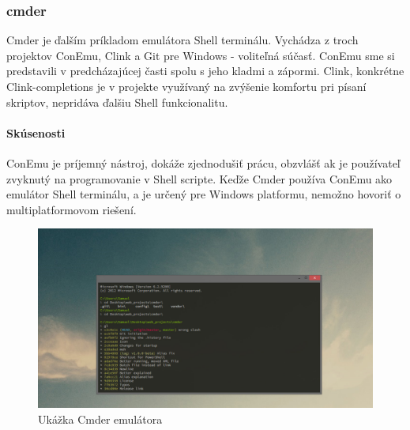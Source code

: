 \subsubsection{cmder}
\indent Cmder je ďalším príkladom emulátora Shell terminálu. Vychádza z troch projektov ConEmu, Clink a Git pre Windows - voliteľná súčasť. ConEmu sme si predstavili v predcházajúcej časti spolu s jeho kladmi a zápormi. Clink, konkrétne Clink-completions je v projekte využívaný na zvýšenie komfortu pri písaní skriptov, nepridáva ďalšiu Shell funkcionalitu. \cite{cmder}
\paragraph{Skúsenosti}
\indent ConEmu je príjemný nástroj, dokáže zjednodušiť prácu, obzvlášť ak je používateľ zvyknutý na programovanie v Shell scripte. Keďže Cmder používa ConEmu ako emulátor Shell terminálu, a je určený pre Windows platformu, nemožno hovoriť o multiplatformovom riešení.
\begin{figure}[!htbp]
	\centering
	\includegraphics[scale=0.3]{img/cmder.jpg}
	\caption{Ukážka Cmder emulátora}
	\label{fig:test}
\end{figure}
\newpage
